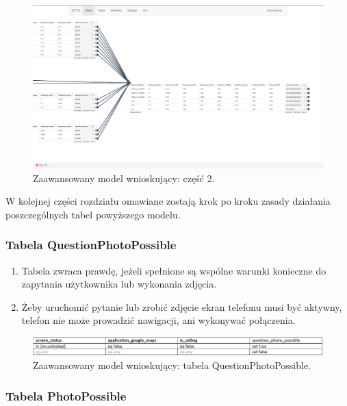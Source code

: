 \begin{figure}[H]
\centering
\includegraphics[scale=0.8]{rozdzial4/HMR_advancedModelPart2.png}
\caption{Zaawansowany model wnioskujący: część 2.}
\end{figure}

W kolejnej części rozdziału omawiane zostają krok po kroku zasady działania poszczególnych tabel powyższego modelu.


\subsubsection{Tabela QuestionPhotoPossible}

\begin{enumerate}
	\item Tabela zwraca prawdę, jeżeli spełnione są wspólne warunki konieczne do zapytania użytkownika lub wykonania zdjęcia.
	\item Żeby uruchomić pytanie lub zrobić zdjęcie ekran telefonu musi być aktywny, telefon nie może prowadzić nawigacji, ani wykonywać połączenia.
\end{enumerate}

\begin{figure}[H]
	\centering
	\includegraphics[scale=0.8]{rozdzial4/HMR_QuestionPhotoPossible.png}
	\caption{Zaawansowany model wnioskujący: tabela QuestionPhotoPossible.}
\end{figure}


\subsubsection{Tabela PhotoPossible}

